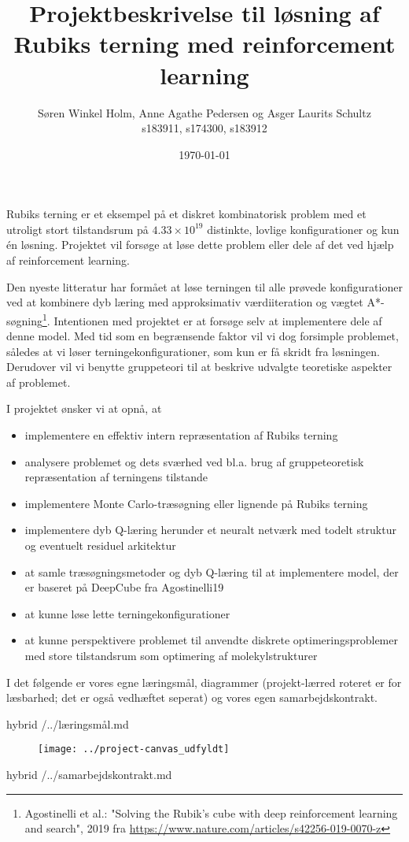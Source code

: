 \documentclass[12pt,fleqn,]{article}
\title{Projektbeskrivelse til løsning af Rubiks terning med reinforcement learning}
\author{Søren Winkel Holm, Anne Agathe Pedersen og Asger Laurits Schultz\\
s183911, s174300, s183912}
\date{\today}
\begin{document}
\maketitle
\noindent
Rubiks terning er et eksempel på et diskret kombinatorisk problem med et utroligt stort tilstandsrum på $4.33\times 10^{19}$ distinkte, lovlige konfigurationer og kun én løsning. 
Projektet vil forsøge at løse dette problem eller dele af det ved hjælp af reinforcement learning. 

Den nyeste litteratur har formået at løse terningen til alle prøvede konfigurationer ved at kombinere dyb læring med approksimativ værdiiteration og vægtet A*-søgning\footnote{Agostinelli et al.: "Solving the Rubik’s cube with deep reinforcement learning and search", 2019 fra
	\url{https://www.nature.com/articles/s42256-019-0070-z}
}.
Intentionen med projektet er at forsøge selv at implementere dele af denne model. 
Med tid som en begrænsende faktor vil vi dog forsimple problemet, således at vi løser terningekonfigurationer, som kun er få skridt fra løsningen.
Derudover vil vi benytte gruppeteori til at beskrive udvalgte teoretiske aspekter af problemet.

I projektet ønsker vi at opnå, at
\begin{itemize}
	\item implementere en effektiv intern repræsentation af Rubiks terning
	\item analysere problemet og dets sværhed ved bl.a. brug af gruppeteoretisk repræsentation af terningens tilstande
	\item implementere Monte Carlo-træsøgning eller lignende på Rubiks terning
	\item implementere dyb Q-læring herunder et neuralt netværk med todelt struktur og eventuelt residuel arkitektur
	\item at samle træsøgningsmetoder og dyb Q-læring til at implementere model, der er baseret på DeepCube fra Agostinelli19
	\item at kunne løse lette terningekonfigurationer
	\item at kunne perspektivere problemet til anvendte diskrete optimeringsproblemer med store tilstandsrum som optimering af molekylstrukturer
\end{itemize}
I det følgende er vores egne læringsmål, diagrammer (projekt-lærred roteret er for læsbarhed; det er også vedhæftet seperat) og vores egen samarbejdskontrakt.
\newpage
\begin{markdown*}{hybrid}
/../læringsmål.md
\end{markdown*}





 

\begin{figure}[H]
	\centering
	\texttt{[image: ../project-canvas\_udfyldt]}
\end{figure}
\thispagestyle{empty}
\newpage 

\begin{markdown*}{hybrid}
/../samarbejdskontrakt.md
\end{markdown*}
\end{document}
